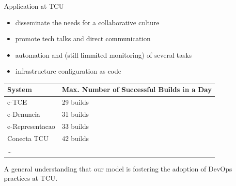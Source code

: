 \documentclass{beamer}
\begin{document}

\begin{frame}
  \begin{center}{\color{blue}Application at TCU}\end{center} \pause

   \begin{itemize}
     \item disseminate the needs for a collaborative culture
     \item promote tech talks and direct communication 
     \item automation and (still limmited monitoring) of several tasks
     \item infrastructure configuration as code 
    \end{itemize}
   
\end{frame}

  \begin{frame}
    \begin{center}
    \begin{tabular}{ll}\toprule
      System & Max. Number of Successful Builds in a Day \\ \midrule
      e-TCE & 29 builds \\
      e-Denuncia & 31 builds \\
      e-Representacao & 33 builds \\
      Conecta TCU & 42 builds \\
      \ldots & \\ \bottomrule
    \end{tabular}
    \end{center}

    \pause
    
    A general understanding that our model is fostering the
    adoption of DevOps practices at TCU. 

    \end{frame}
    
\end{document}
